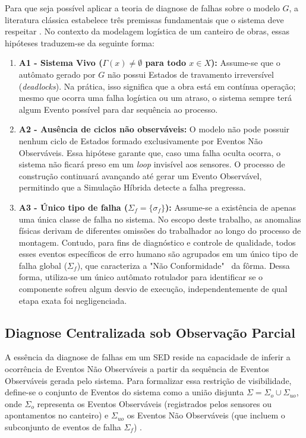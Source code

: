 Para que seja possível aplicar a teoria de diagnose de falhas sobre o modelo $G$, a literatura clássica estabelece três premissas fundamentais que o sistema deve respeitar \cite{basilio2010}. No contexto da modelagem logística de um canteiro de obras, essas hipóteses traduzem-se da seguinte forma:
\begin{enumerate}
	\item \textbf{A1 - Sistema Vivo ($\Gamma(x) \neq \emptyset$ para todo $x \in X$):} Assume-se que o autômato gerado por $G$ não possui Estados de travamento irreversível (\textit{deadlocks}). Na prática, isso significa que a obra está em contínua operação; mesmo que ocorra uma falha logística ou um atraso, o sistema sempre terá algum Evento possível para dar sequência ao processo.
	\item \textbf{A2 - Ausência de ciclos não observáveis:} O modelo não pode possuir nenhum ciclo de Estados formado exclusivamente por Eventos Não Observáveis. Essa hipótese garante que, caso uma falha oculta ocorra, o sistema não ficará preso em um \textit{loop} invisível aos sensores. O processo de construção continuará avançando até gerar um Evento Observável, permitindo que a Simulação Híbrida detecte a falha pregressa.
	\item \textbf{A3 - Único tipo de falha ($\Sigma_f = \{\sigma_f\}$):} Assume-se a existência de apenas uma única classe de falha no sistema. No escopo deste trabalho, as anomalias físicas derivam de diferentes omissões do trabalhador ao longo do processo de montagem. Contudo, para fins de diagnóstico e controle de qualidade, todos esses eventos específicos de erro humano são agrupados em um único tipo de falha global ($\Sigma_f$), que caracteriza a "Não Conformidade" \ da fôrma. Dessa forma, utiliza-se um único autômato rotulador para identificar se o componente sofreu algum desvio de execução, independentemente de qual etapa exata foi negligenciada.
\end{enumerate}

\subsection{Diagnose Centralizada sob Observação Parcial}
\label{subsec:diagnosticador}

A essência da diagnose de falhas em um SED reside na capacidade de inferir a ocorrência de Eventos Não Observáveis a partir da sequência de Eventos Observáveis gerada pelo sistema. Para formalizar essa restrição de visibilidade, define-se o conjunto de Eventos do sistema como a união disjunta $\Sigma = \Sigma_o \cup \Sigma_{uo}$, onde $\Sigma_o$ representa os Eventos Observáveis (registrados pelos sensores ou apontamentos no canteiro) e $\Sigma_{uo}$ os Eventos Não Observáveis (que incluem o subconjunto de eventos de falha $\Sigma_f$) \cite{basilio2010}. 

